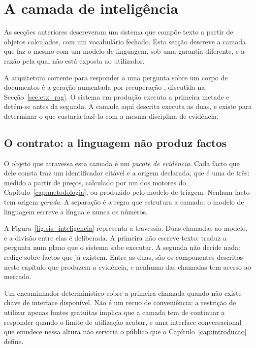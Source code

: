 \section{A camada de inteligência}
\label{sec:sis_inteligencia}

As secções anteriores descreveram um sistema que compõe texto a partir de objetos calculados, com
um vocabulário fechado. Esta secção descreve a camada que faz o mesmo com um modelo de linguagem,
sob uma garantia diferente, e a razão pela qual não está exposta ao utilizador.

A arquitetura corrente para responder a uma pergunta sobre um corpo de documentos é a geração
aumentada por recuperação \autocite{lewis2020rag}, discutida na Secção~\ref{sec:ctx_rag}. O
sistema em produção executa a primeira metade e detém-se antes da segunda. A camada aqui descrita
executa as duas, e existe para determinar o que custaria fazê-lo com a mesma disciplina de
evidência.

\subsection{O contrato: a linguagem não produz factos}

O objeto que atravessa esta camada é um \emph{pacote de evidência}. Cada facto que dele consta traz
um identificador citável e a origem declarada, que é uma de três: medido a partir de preços,
calculado por um dos motores do Capítulo~\ref{cap:metodologia}, ou produzido pelo modelo de triagem.
Nenhum facto tem origem \emph{gerada}. A separação é a regra que estrutura a camada: o modelo de
linguagem escreve a língua e nunca os números.

A Figura~\ref{fig:sis_inteligencia} representa a travessia. Duas chamadas ao modelo, e a divisão
entre elas é deliberada. A primeira não escreve texto: traduz a pergunta num plano que o sistema
sabe executar. A segunda não decide nada: redige sobre factos que já existem. Entre as duas, são
os componentes descritos neste capítulo que produzem a evidência, e nenhuma das chamadas tem
acesso ao mercado.

Um encaminhador determinístico cobre a primeira chamada quando não existe chave de interface
disponível. Não é um recuo de conveniência: a restrição de utilizar apenas fontes gratuitas
implica que a camada tem de continuar a responder quando o limite de utilização acabar, e uma
interface conversacional que emudece nessa altura não serviria o público que o
Capítulo~\ref{cap:introducao} define.

